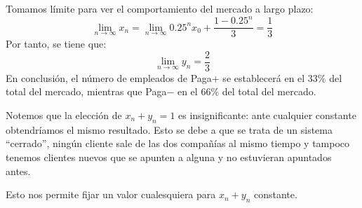 \begin{ejercicio}
    Tomamos límite para ver el comportamiento del mercado a largo plazo:
    $$\lim_{n \to \infty} x_n = \lim_{n \to \infty} 0.25^nx_0 + \frac{1-0.25^n}{3} = \dfrac{1}{3}$$
    Por tanto, se tiene que:
    $$\lim_{n \to \infty} y_n = \dfrac{2}{3}$$
    En conclusión, el número de empleados de Paga$+$ se establecerá en el $33\%$ del total del mercado, mientras que Paga$-$ en el $66\%$ del total del mercado.
    
\begin{observacion}
    Notemos que la elección de $x_n + y_n = 1$ es insignificante: ante cualquier constante obtendríamos el mismo resultado. Esto se debe a que se trata de un sistema ``cerrado'', ningún cliente sale de las dos compañías al mismo tiempo y tampoco tenemos clientes nuevos que se apunten a alguna y no estuvieran apuntados antes.   

    Esto nos permite fijar un valor cualesquiera para $x_n + y_n$ constante.
\end{observacion}
        
\end{ejercicio}


